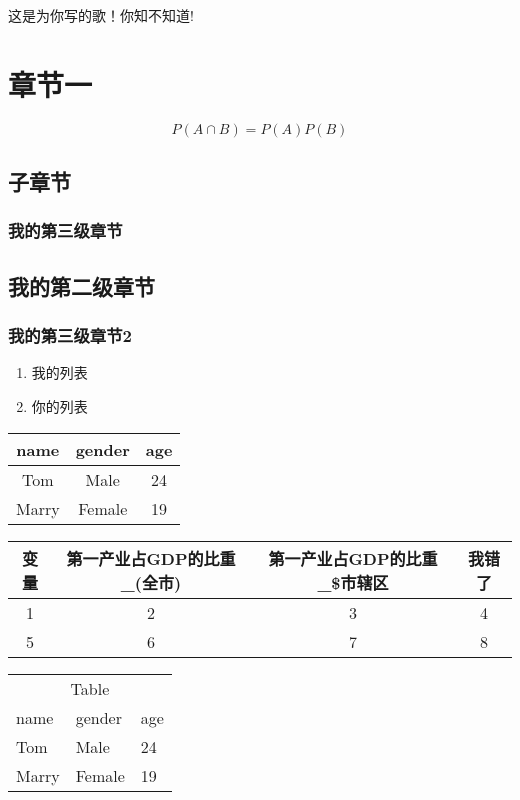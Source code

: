 \documentclass[12pt,a4paper,UTF8]{article}
\begin{document}
这是为你写的歌！你知不知道!
\section{章节一}
$$P(A \cap B) = P(A)P(B)$$
\subsection{子章节}
\subsubsection*{我的第三级章节}
\subsection*{我的第二级章节}
\subsubsection*{我的第三级章节2}
\begin{enumerate}
\item
我的列表
\item
你的列表
\end{enumerate}
\begin{center}
\begin{tabular}{|c|c|c|}
\hline
name&gender&age\\
\hline
Tom&Male&24\\
\hline
Marry&Female&19\\
\hline
\end{tabular}
\end{center}
\begin{center}
\begin{tabular}{|c|c|c|c|}
\hline
变量&第一产业占GDP的比重\_(全市)&第一产业占GDP的比重\_\$市辖区&我错了\\
\hline
1&2&3&4\\
\hline
5&6&7&8\\
\hline
\end{tabular}
\end{center}
\begin{tabularx}{90mm}{XXX}
\toprule
\multicolumn{3}{c}{Table} \\
\cmidrule(r){1-3}
name & gender & age \\
\midrule
Tom & Male & 24 \\
Marry & Female & 19 \\
\bottomrule
\end{tabularx}
\end{document}
